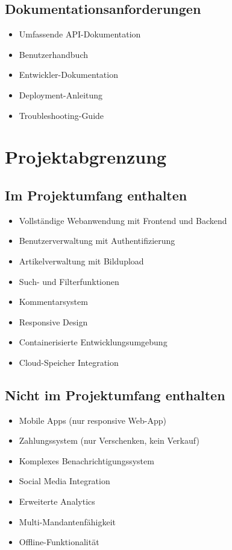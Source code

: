 \documentclass[a4paper,12pt]{article}
\begin{document}
\subsection{Dokumentationsanforderungen}
\begin{itemize}
    \item Umfassende API-Dokumentation
    \item Benutzerhandbuch
    \item Entwickler-Dokumentation
    \item Deployment-Anleitung
    \item Troubleshooting-Guide
\end{itemize}

\section{Projektabgrenzung}

\subsection{Im Projektumfang enthalten}
\begin{itemize}
    \item Vollständige Webanwendung mit Frontend und Backend
    \item Benutzerverwaltung mit Authentifizierung
    \item Artikelverwaltung mit Bildupload
    \item Such- und Filterfunktionen
    \item Kommentarsystem
    \item Responsive Design
    \item Containerisierte Entwicklungsumgebung
    \item Cloud-Speicher Integration
\end{itemize}

\subsection{Nicht im Projektumfang enthalten}
\begin{itemize}
    \item Mobile Apps (nur responsive Web-App)
    \item Zahlungssystem (nur Verschenken, kein Verkauf)
    \item Komplexes Benachrichtigungssystem
    \item Social Media Integration
    \item Erweiterte Analytics
    \item Multi-Mandantenfähigkeit
    \item Offline-Funktionalität
\end{itemize}
\end{document}
